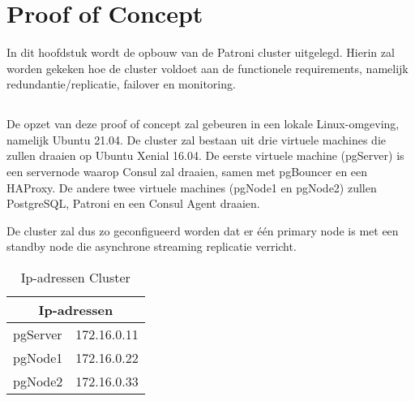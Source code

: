 
\chapter{Proof of Concept}
\label{ch:Proof of Concept}

In dit hoofdstuk wordt de opbouw van de Patroni cluster uitgelegd. Hierin zal worden gekeken hoe de cluster voldoet aan de functionele requirements, namelijk redundantie/replicatie, failover en monitoring.

\section{}
\label{sec:Omgeving}
De opzet van deze proof of concept zal gebeuren in een lokale Linux-omgeving, namelijk Ubuntu 21.04.
De cluster zal bestaan uit drie virtuele machines die zullen draaien op Ubuntu Xenial 16.04. De eerste virtuele machine (pgServer) is een servernode waarop Consul zal draaien, samen met pgBouncer en een HAProxy. De andere twee virtuele machines (pgNode1 en pgNode2) zullen PostgreSQL, Patroni en een Consul Agent draaien.

De cluster zal dus zo geconfigueerd worden dat er één primary node is met een standby node die asynchrone streaming replicatie verricht.

\begin{table}
    \centering
    \begin{tabular}{ |p{6cm}||p{6cm}|  }
        \hline
        \multicolumn{2}{|c|}{Ip-adressen} \\
        \hline
        pgServer & 172.16.0.11 \\
        \hline
        pgNode1 & 172.16.0.22 \\
        \hline
        pgNode2 & 172.16.0.33 \\
        \hline
    \end{tabular}
    \caption{Ip-adressen Cluster}
    \label{table:Ip-adressen Cluster}
\end{table}

\section{}
\label{sec:Prerequisites}

